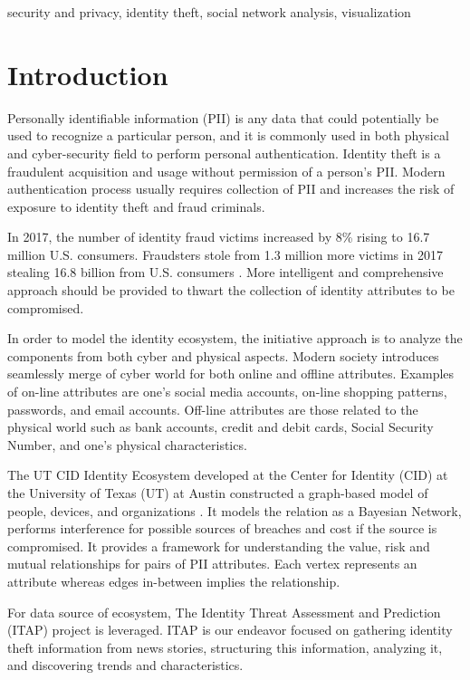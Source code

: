 \documentclass[conference]{IEEEtran}
\begin{document}
\begin{IEEEkeywords}
security and privacy, identity theft, social network analysis, visualization
\end{IEEEkeywords}

\section{Introduction}
 Personally identifiable information (PII) is any data that could potentially be used to recognize a particular person, and it is commonly used in both physical and cyber-security field to perform personal authentication. Identity theft is a fraudulent acquisition and usage without permission of a person's PII. Modern authentication process usually requires collection of PII and increases the risk of exposure to identity theft and fraud criminals.

In 2017, the number of identity fraud victims increased by 8\% rising to 16.7 million U.S. consumers. Fraudsters stole from 1.3 million more victims in 2017 stealing 16.8 billion from U.S. consumers \cite{Pascual}. More intelligent and comprehensive approach should be provided to thwart the collection of identity attributes to be compromised. 


In order to model the identity ecosystem, the initiative approach is to analyze the components from both cyber and physical aspects. Modern society introduces seamlessly merge of cyber world for both online and offline attributes. Examples of on-line attributes are one's social media accounts, on-line shopping patterns, passwords, and email accounts. Off-line attributes are those related to the physical world such as bank accounts, credit and debit cards, Social Security Number, and one's physical characteristics.

 The UT CID Identity Ecosystem developed at the Center for Identity (CID) at the University of Texas (UT) at Austin constructed a graph-based model of people, devices, and organizations \cite{EcosystemModeling}. It models the relation as a Bayesian Network, performs interference for possible sources of breaches and cost if the source is compromised.
It provides a framework for understanding the value, risk and mutual relationships for pairs of PII attributes. Each vertex represents an attribute whereas edges in-between implies the relationship.

For data source of ecosystem, The Identity Threat Assessment and Prediction (ITAP) \cite{ITAPDataSource} project is leveraged. ITAP is our endeavor focused on gathering identity theft information from news stories, structuring this information, analyzing it, and discovering trends and characteristics.
\end{document}

